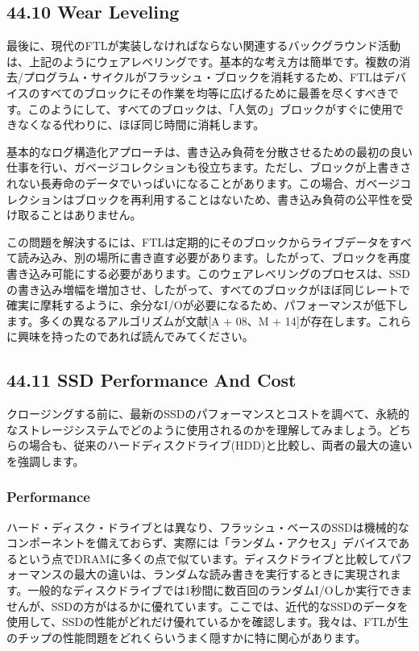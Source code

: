 \hypertarget{wear-leveling}{%
\subsection*{44.10 Wear Leveling}\label{wear-leveling}}

最後に、現代のFTLが実装しなければならない関連するバックグラウンド活動は、上記のようにウェアレベリングです。基本的な考え方は簡単です。複数の消去/プログラム・サイクルがフラッシュ・ブロックを消耗するため、FTLはデバイスのすべてのブロックにその作業を均等に広げるために最善を尽くすべきです。このようにして、すべてのブロックは、「人気の」ブロックがすぐに使用できなくなる代わりに、ほぼ同じ時間に消耗します。

基本的なログ構造化アプローチは、書き込み負荷を分散させるための最初の良い仕事を行い、ガベージコレクションも役立ちます。ただし、ブロックが上書きされない長寿命のデータでいっぱいになることがあります。この場合、ガベージコレクションはブロックを再利用することはないため、書き込み負荷の公平性を受け取ることはありません。

この問題を解決するには、FTLは定期的にそのブロックからライブデータをすべて読み込み、別の場所に書き直す必要があります。したがって、ブロックを再度書き込み可能にする必要があります。このウェアレベリングのプロセスは、SSDの書き込み増幅を増加させ、したがって、すべてのブロックがほぼ同じレートで確実に摩耗するように、余分なI/Oが必要になるため、パフォーマンスが低下します。多くの異なるアルゴリズムが文献{[}A
+ 08、M +
14{]}が存在します。これらに興味を持ったのであれば読んでみてください。

\hypertarget{ssd-performance-and-cost}{%
\subsection*{44.11 SSD Performance And
Cost}\label{ssd-performance-and-cost}}

クロージングする前に、最新のSSDのパフォーマンスとコストを調べて、永続的なストレージシステムでどのように使用されるのかを理解してみましょう。どちらの場合も、従来のハードディスクドライブ(HDD)と比較し、両者の最大の違いを強調します。

\hypertarget{performance}{%
\subsubsection*{Performance}\label{performance}}

ハード・ディスク・ドライブとは異なり、フラッシュ・ベースのSSDは機械的なコンポーネントを備えておらず、実際には「ランダム・アクセス」デバイスであるという点でDRAMに多くの点で似ています。ディスクドライブと比較してパフォーマンスの最大の違いは、ランダムな読み書きを実行するときに実現されます。一般的なディスクドライブでは1秒間に数百回のランダムI/Oしか実行できませんが、SSDの方がはるかに優れています。ここでは、近代的なSSDのデータを使用して、SSDの性能がどれだけ優れているかを確認します。我々は、FTLが生のチップの性能問題をどれくらいうまく隠すかに特に関心があります。


